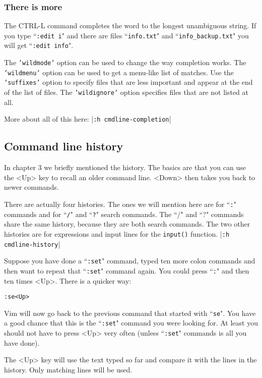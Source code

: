 \subsubsection{There is more}
The CTRL-L command completes the word to the longest unambiguous string.
If you type ``\texttt{:edit i}" and there are files ``\texttt{info.txt}" and ``\texttt{info\_backup.txt}" you will get ``\texttt{:edit info}".

The \texttt{'wildmode'} option can be used to change the way completion works.
The \texttt{'wildmenu'} option can be used to get a menu-like list of matches.
Use the \texttt{'suffixes'} option to specify files that are less important and appear at the end of the list of files.
The \texttt{'wildignore'} option specifies files that are not listed at all.

More about all of this here: |\texttt{:h cmdline-completion}|
\subsection{Command line history}
In chapter 3 we briefly mentioned the history.
The basics are that you can use the <Up> key to recall an older command line.
<Down> then takes you back to newer commands.

There are actually four histories.
The ones we will mention here are for ``\texttt{:}" commands and for ``\texttt{/}" and ``\texttt{?}" search commands.
The ``/" and ``?" commands share the same history, because they are both search commands.
The two other histories are for expressions and input lines for the \texttt{input()} function.
|\texttt{:h cmdline-history}|

Suppose you have done a ``\texttt{:set}" command, typed ten more colon commands and then want to repeat that ``\texttt{:set}" command again.
You could press ``\texttt{:}" and then ten times <Up>.
There is a quicker way:

\begin{Verbatim}[samepage=true]
 :se<Up>
\end{Verbatim}

Vim will now go back to the previous command that started with ``\texttt{se}".
You have a good chance that this is the ``\texttt{:set}" command you were looking for.
At least you should not have to press <Up> very often (unless ``\texttt{:set}" commands is all you have done).

The <Up> key will use the text typed so far and compare it with the lines in the history.
Only matching lines will be used.

